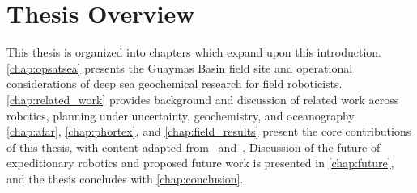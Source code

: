 \section{Thesis Overview}
This thesis is organized into chapters which expand upon this introduction. \cref{chap:opsatsea} presents the Guaymas Basin field site and operational considerations of deep sea geochemical research for field roboticists. \cref{chap:related_work} provides background and discussion of related work across robotics, planning under uncertainty, geochemistry, and oceanography. \cref{chap:afar}, \cref{chap:phortex}, and \cref{chap:field_results} present the core contributions of this thesis, with content adapted from~\cite{preston2022discovering} and~\cite{preston2022physically}. Discussion of the future of expeditionary robotics and proposed future work is presented in \cref{chap:future}, and the thesis concludes with \cref{chap:conclusion}.

